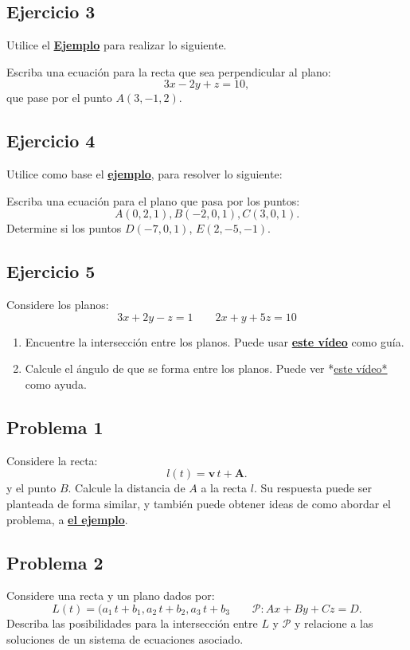 \documentclass[11pt]{article}
\begin{document}
\subsection{Ejercicio 3}
\label{sec:orgb583d71}
Utilice el \textbf{\href{https://vimeo.com/574241043}{Ejemplo}} para realizar lo siguiente.

Escriba una ecuación para la recta que sea perpendicular al plano:
\[
3x - 2y + z = 10,
\]
que pase por el punto \(A(3, -1, 2)\).

\subsection{Ejercicio 4}
\label{sec:orgd86dbbb}

Utilice como base el \textbf{\href{https://vimeo.com/574241111}{ejemplo}}, para resolver lo siguiente:

Escriba una ecuación para el plano que pasa por los puntos:
  \[
    A(0, 2, 1), B(-2, 0, 1), C(3, 0, 1).
  \]
Determine si los puntos \(D(-7, 0, 1)\), \(E(2, -5, -1)\).

\subsection{Ejercicio 5}
\label{sec:orga75e60d}

Considere los planos:
\[ 
3x + 2y - z = 1
\qquad
2x + y + 5z = 10
\]
\begin{enumerate}
\item Encuentre la intersección entre los planos. Puede usar \textbf{\href{https://vimeo.com/574241177}{este vídeo}} como guía.
\item Calcule el ángulo de que se forma entre los planos. Puede ver *\href{https://vimeo.com/574241229}{este vídeo*} como ayuda.
\end{enumerate}

\subsection{Problema 1}
\label{sec:orge546a5a}
Considere la recta:
  \[
    l(t) = \mathbf{v} \, t + \mathbf{A}.
  \]
  y el punto \(B\). Calcule la distancia de \(A\) a la recta \(l\). Su respuesta puede ser planteada de forma similar, y también puede obtener ideas de como abordar el problema, a \textbf{\href{https://vimeo.com/574241301}{el ejemplo}}.

\subsection{Problema 2}
\label{sec:orga3caf84}

Considere una recta y un plano dados por:
  \[
    L(t) = (a_1 \, t + b_1, a_2 \, t + b_2, a_3 \, t + b_3
    \qquad
    \mathcal{P}: Ax + By + Cz = D.
  \]
  Describa las posibilidades para la intersección entre \(L\) y \(\mathcal{P}\) y relacione a las soluciones de un sistema de ecuaciones asociado.
\end{document}
